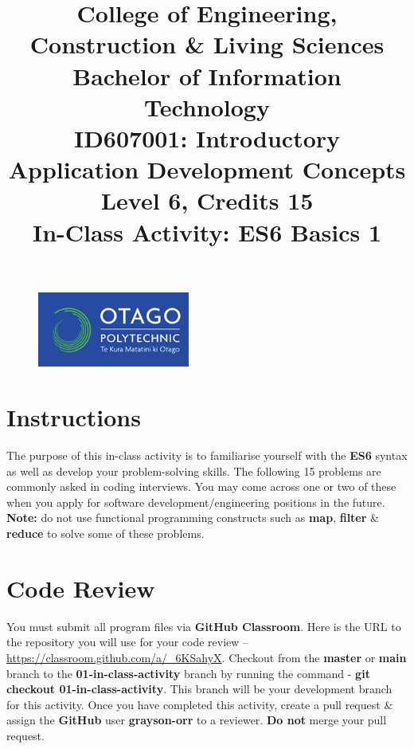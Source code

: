 \documentclass{article}
\author{}
\begin{document}
\begin{figure}
	\centering
	\includegraphics[width=50mm]{../img/logo.png}
\end{figure}

\title{College of Engineering, Construction \& Living Sciences\\Bachelor of Information Technology\\ID607001: Introductory Application Development Concepts\\Level 6, Credits 15\\\textbf{In-Class Activity: ES6 Basics 1}}
\date{}
\maketitle
 
\section*{Instructions}
The purpose of this in-class activity is to familiarise yourself with the \textbf{ES6} syntax as well as develop your problem-solving skills. The following 15 problems are commonly asked in coding interviews. You may come across one or two of these when you apply for software development/engineering positions in the future. \textbf{Note:} do not use functional programming constructs such as \textbf{map}, \textbf{filter} \& \textbf{reduce} to solve some of these problems.

\section*{Code Review}
You must submit all program files via \textbf{GitHub Classroom}. Here is the URL to the repository you will use for your code review – \href{https://classroom.github.com/a/\_6KSahyX}{https://classroom.github.com/a/\_6KSahyX}. Checkout from the \textbf{master} or \textbf{main} branch to the \textbf{01-in-class-activity} branch by running the command - \textbf{git checkout 01-in-class-activity}. This branch will be your development branch for this activity. Once you have completed this activity, create a pull request \& assign the \textbf{GitHub} user \textbf{grayson-orr} to a reviewer. \textbf{Do not} merge your pull request.
\end{document}
